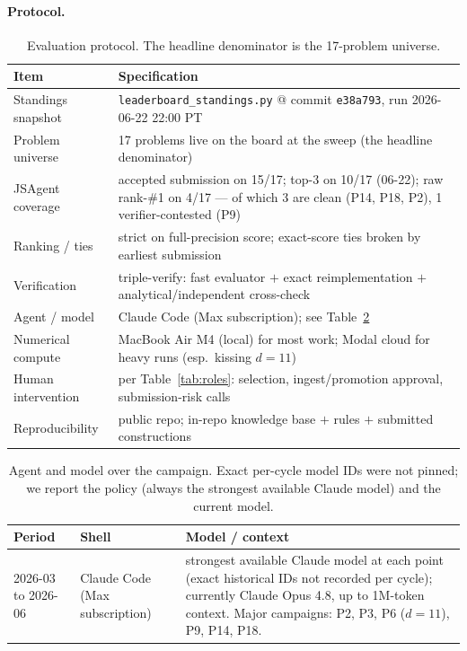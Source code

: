 \documentclass[11pt]{article}
\begin{document}
\paragraph{Protocol.}
\begin{table}[htbp]
\centering\small
\caption{Evaluation protocol. The headline denominator is the 17-problem universe.}
\label{tab:protocol}
\begin{tabularx}{\textwidth}{lX}
\toprule
Item & Specification \\
\midrule
Standings snapshot   & \texttt{leaderboard\_standings.py} @ commit \texttt{e38a793}, run 2026-06-22 22:00 PT \\
Problem universe     & 17 problems live on the board at the sweep (the headline denominator) \\
JSAgent coverage     & accepted submission on 15/17; top-3 on 10/17 (06-22); raw rank-\#1 on 4/17 --- of which 3 are clean (P14, P18, P2), 1 verifier-contested (P9) \\
Ranking / ties       & strict on full-precision score; exact-score ties broken by earliest submission \\
Verification         & triple-verify: fast evaluator $+$ exact reimplementation $+$ analytical/independent cross-check \\
Agent / model        & Claude Code (Max subscription); see Table~\ref{tab:models} \\
Numerical compute    & MacBook Air M4 (local) for most work; Modal cloud for heavy runs (esp.\ kissing $d{=}11$) \\
Human intervention   & per Table~\ref{tab:roles}: selection, ingest/promotion approval, submission-risk calls \\
Reproducibility      & public repo; in-repo knowledge base $+$ rules $+$ submitted constructions \\
\bottomrule
\end{tabularx}
\end{table}

\begin{table}[htbp]
\centering\small
\caption{Agent and model over the campaign. Exact per-cycle model IDs were not pinned; we
report the policy (always the strongest available Claude model) and the current model.}
\label{tab:models}
\begin{tabularx}{\textwidth}{llX}
\toprule
Period & Shell & Model / context \\
\midrule
2026-03 to 2026-06 & Claude Code (Max subscription) &
  strongest available Claude model at each point (exact historical IDs not recorded per cycle);
  currently Claude Opus 4.8, up to 1M-token context. Major campaigns: P2, P3, P6 ($d{=}11$),
  P9, P14, P18. \\
\bottomrule
\end{tabularx}
\end{table}
\end{document}

